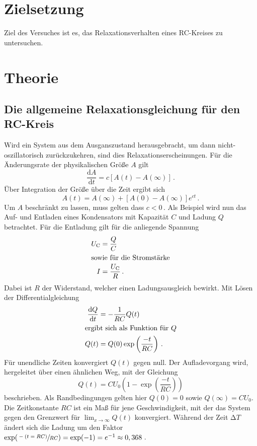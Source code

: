 \section{Zielsetzung}
Ziel des Versuches ist es, das Relaxationsverhalten eines RC-Kreises zu untersuchen.

\section{Theorie}
\label{sec:Theorie}
\subsection{Die allgemeine Relaxationsgleichung für den RC-Kreis}
Wird ein System aus dem Ausganszustand herausgebracht, um dann
nicht-oszillatorisch zurückzukehren, sind dies Relaxationserscheinungen.
Für die Änderungsrate der physikalischen Größe $A$ gilt 
\begin{equation*}
    \frac{\text{d}A}{\text{d}t}=c[A(t)-A(\infty)]\,.
\end{equation*}
Über Integration der Größe über die Zeit ergibt sich 
\begin{equation*}
    A(t)=A(\infty)+[A(0)-A(\infty)]e^{ct}\,.
\end{equation*}
Um $A$ beschränkt zu lassen, muss gelten dass $c<0$\,.
Als Beispiel wird nun das Auf- und Entladen eines Kondensators
mit Kapazität $C$ und Ladung $Q$ betrachtet.
Für die Entladung gilt für die anliegende Spannung 
\begin{align*}
    U_\text{C}&=\frac{Q}{C}\\
    \intertext{sowie für die Stromstärke}
    I&=\frac{U_\text{C}}{R}\,.
\end{align*}
Dabei ist $R$ der Widerstand, welcher einen Ladungsausgleich bewirkt.
Mit Lösen der Differentialgleichung 
\begin{align*}
    \frac{\text{d}Q}{\text{d}t}&=-\frac{1}{RC}Q(t)\\
    \intertext{ergibt sich als Funktion für $Q$}
    Q(t)&=Q(0)\exp\left(\frac{-t}{RC}\right)\,.
\end{align*}
Für unendliche Zeiten konvergiert $Q(t)$ gegen null.
Der Aufladevorgang wird, hergeleitet über einen ähnlichen Weg,
mit der Gleichung 
\begin{equation*}
    Q(t)=CU_0(1-\exp\left(\frac{-t}{RC}\right))
\end{equation*}
beschrieben.
Als Randbedingungen gelten hier $Q(0)=0$ sowie $Q(\infty)=CU_0$.
Die Zeitkonstante $RC$ ist ein Maß für jene Geschwindigkeit, mit der 
das System gegen den Grenzwert für $\displaystyle \lim_{x \to \infty}Q(t)$
konvergiert. Während der Zeit $\increment T$ ändert sich die Ladung um 
den Faktor $\exp(\sfrac{-(t=RC)}{RC})=\exp(-1)=e^{-1}\approx0,368$\,. 

